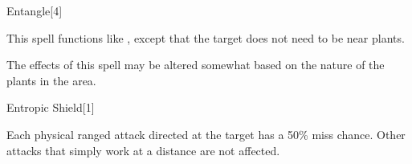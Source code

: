 \begin{spellsection}[Greater]{Entangle}[4]
    \begin{spellheader}
    \end{spellheader}
    \begin{spellcontent}
        \begin{spelltargetinginfo}
        \end{spelltargetinginfo}
        \begin{spelleffects}
            \spellspecial This spell functions like , except that the target does not need to be near plants.
        \end{spelleffects}
    \end{spellcontent}
    \begin{spellfooter}
        \spellnotes The effects of this spell may be altered somewhat based on the nature of the plants in the area.
        \miscastrandom
    \end{spellfooter}
\end{spellsection}

\begin{spellsection}{Entropic Shield}[1]
    \begin{spellheader}
    \end{spellheader}
    \begin{spellcontent}
        \begin{spelltargetinginfo}
        \end{spelltargetinginfo}
        \begin{spelleffects}
            \spelleffect Each physical ranged attack directed at the target has a 50\% miss chance. Other attacks that simply work at a distance are not affected.
            \spelldur \durshort \dismissable
        \end{spelleffects}
    \end{spellcontent}
    \begin{spellfooter}
        \miscastrandom
    \end{spellfooter}
\end{spellsection}

